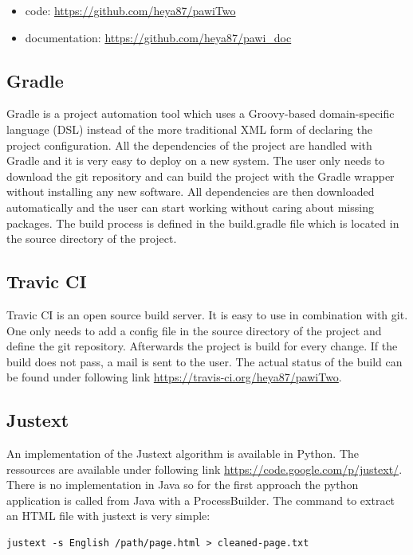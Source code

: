 \begin{itemize}
\item code: \url{https://github.com/heya87/pawiTwo}
\item documentation: \url{https://github.com/heya87/pawi_doc}
\end{itemize}


\subsection{Gradle}

Gradle is a project automation tool which uses a Groovy-based domain-specific language (DSL) instead of the more traditional XML form of declaring the project configuration. All the dependencies of the project are handled with Gradle and it is very easy to deploy on a new system. The user only needs to download the git repository and can build the project with the Gradle wrapper without installing any new software. All dependencies are then downloaded automatically and the user can start working without caring about missing packages.
The build process is defined in the build.gradle file which is located in the source directory of the project. 

\subsection{Travic CI}

Travic CI is an open source build server. It is easy to use in combination with git. One only needs to add a config file in the source directory of the project and define the git repository. Afterwards the project is build for every change. If the build does not pass, a mail is sent to the user. The actual status of the build can be found under following link \url{https://travis-ci.org/heya87/pawiTwo}.

\subsection{Justext}

An implementation of the Justext algorithm is available in Python. The ressources are available under following link \url{https://code.google.com/p/justext/}. There is no implementation in Java so for the first approach the python application is called from Java with a ProcessBuilder.
The command to extract an HTML file with justext is very simple:

\begin {lstlisting}
justext -s English /path/page.html > cleaned-page.txt
\end{lstlisting}

